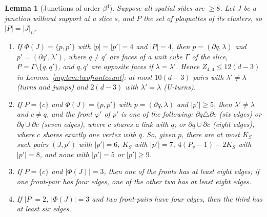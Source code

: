 \documentclass[11pt,a4paper]{article}
\newtheorem{lemma}[theorem]{Lemma}
\theoremstyle{definition}
\theoremstyle{remark}
\begin{document}
\begin{lemma}[Junctions of order $\beta^4$]\label{mg:lem:betafour}
Suppose all spatial sides are $\ge8$. Let $J$ be a junction without support at a slice $s$, and $P$ the set of plaquettes of its clusters, so $|P|=|J|_C$.
\begin{enumerate}[label=(\roman*)]
\item If $\Phi(J)=\{p,p'\}$ with $|p|=|p'|=4$ and $|P|=4$, then $p=(\partial q,\lambda)$ and $p'=(\partial q',\lambda')$, where $q\ne q'$ are faces of a unit cube
$\Gamma$ of the slice, $P=\Gamma\setminus\{q,q'\}$, and $q,q'$ are opposite faces if $\lambda=\lambda'$. Hence $Z_{4,4}\le12(d-3)$ in
Lemma~\ref{mg:lem:twofrontcount}: at most $10(d-3)$ pairs with $\lambda'\ne\lambda$ (turns and jumps) and $2(d-3)$ with $\lambda'=\lambda$ (U-turns).
\item If $P=\{c\}$ and $\Phi(J)=\{p,p'\}$ with $p=(\partial q,\lambda)$ and $|p'|\ge5$, then $\lambda'\ne\lambda$ and $c\ne q$, and the front $\varphi'$ of $p'$ is one of the
following: $\partial q\triangle\partial c$ (six edges) or $\partial q\cup\partial c$ (seven edges), where $c$ shares a link with $q$; or $\partial q\cup\partial c$ (eight
edges), where $c$ shares exactly one vertex with $q$. So, given $p$, there are at most $K_S$ such pairs $(J,p')$ with $|p'|=6$, $K_S$ with $|p'|=7$,
$4(P_v-1)-2K_S$ with $|p'|=8$, and none with $|p'|=5$ or $|p'|\ge9$.
\item If $P=\{c\}$ and $|\Phi(J)|=3$, then one of the fronts has at least eight edges; if one front-pair has four edges, one of the other two has at least
eight edges.
\item If $|P|=2$, $|\Phi(J)|=3$ and two front-pairs have four edges, then the third has at least six edges.
\end{enumerate}
\end{lemma}
\end{document}
